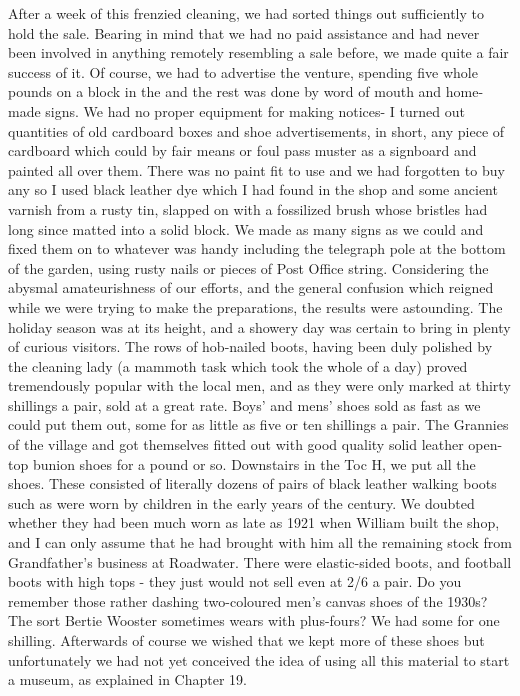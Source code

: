 After a week of this frenzied cleaning, we had sorted things out sufficiently to hold the sale. Bearing in mind that we had no paid assistance and had never been involved in anything remotely resembling a sale before, we made quite a fair success of it. Of course, we had to advertise the venture, spending five whole pounds on a block in the  and the rest was done by word of mouth and home-made signs. We had no proper equipment for making notices- I turned out quantities of old cardboard boxes and shoe advertisements, in short, any piece of cardboard which could by fair means or foul pass muster as a signboard and painted  all over them. There was no paint fit to use and we had forgotten to buy any so I used black leather dye which I had found in the shop and some ancient varnish from a rusty tin, slapped on with a fossilized brush whose bristles had long since matted into a solid block. We made as many signs as we could and fixed them on to whatever was handy including the telegraph pole at the bottom of the garden, using rusty nails or pieces of Post Office string. Considering the abysmal amateurishness of our efforts, and the general confusion which reigned while we were trying to make the preparations, the results were astounding. The holiday season was at its height, and a showery day was certain to bring in plenty of curious visitors. The rows of hob-nailed boots, having been duly polished by the cleaning lady (a mammoth task which took the whole of a day) proved tremendously popular with the local men, and as they were only marked at thirty shillings a pair, sold at a great rate. Boys' and mens' shoes sold as fast as we could put them out, some for as little as five or ten shillings a pair. The Grannies of the village  and got themselves fitted out with good quality solid leather open-top bunion shoes for a pound or so. Downstairs in the Toc H, we put all the  shoes. These consisted of literally dozens of pairs of black leather walking boots such as were worn by children in the early years of the century. We doubted whether they had been much worn as late as 1921 when William built the shop, and I can only assume that he had brought with him all the remaining stock from Grandfather's business at Roadwater. There were elastic-sided boots, and football boots with high tops - they just would not sell even at 2/6 a pair. Do you remember those rather dashing two-coloured men's canvas shoes of the 1930s? The sort Bertie Wooster sometimes wears with plus-fours? We had some for one shilling. Afterwards of course we wished that we kept more of these shoes but unfortunately we had not yet conceived the idea of using all this material to start a museum, as explained in Chapter 19.

